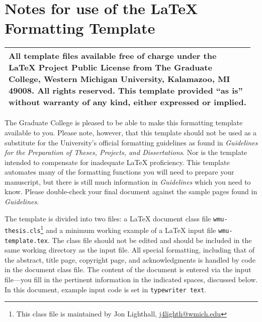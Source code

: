 \documentclass{wmu-thesis}
\begin{document}
\singlespace
\chapter*{Notes for use of the \texorpdfstring{\LaTeX{}\\}{LaTeX} Formatting Template}
\begin{center}
\begin{tabular}{|p{0.97\linewidth}|}
\hline
All template files %
available free of charge under the \LaTeX{} Project Public License from The Graduate College, Western Michigan University, Kalamazoo, MI  49008.  All rights reserved.  %
 This template provided ``as is'' without warranty of any kind, either expressed or implied.\\
\hline
\end{tabular}
\end{center}

The Graduate College is pleased to be able to make this formatting template available to you.  Please note, however, that this template should not be used as a substitute for the University's official formatting guidelines as found in \textit{Guidelines for the Preparation of Theses, Projects, and Dissertations}.  Nor is the template intended to compensate for inadequate \LaTeX{} proficiency.  This template automates many of the formatting functions you will need to prepare your manuscript, but there is still much information in \textit{Guidelines} which you need to know.  Please double-check your final document against the sample pages found in \textit{Guidelines}.

\renewcommand{\thefootnote}{\fnsymbol{footnote}}

The template is divided into two files: a \LaTeX{} document class file \texttt{wmu-thesis.cls}\footnote{This class file is maintained by Jon Lighthall, \href{mailto:j4lighth@wmich.edu}{j4lighth@wmich.edu}} and a minimum working example of a \LaTeX{} input file \texttt{wmu-template.tex}.  The class file should not be edited and should be included in the same working directory as the input file.  All special formatting, including that of the abstract, title page, copyright page, and acknowledgments is handled by code in the document class file.  The content of the document is entered via the input file---you fill in the pertinent information in the indicated spaces, discussed below.  In this document, example input code is set in \texttt{typewriter text}.  
\end{document}

